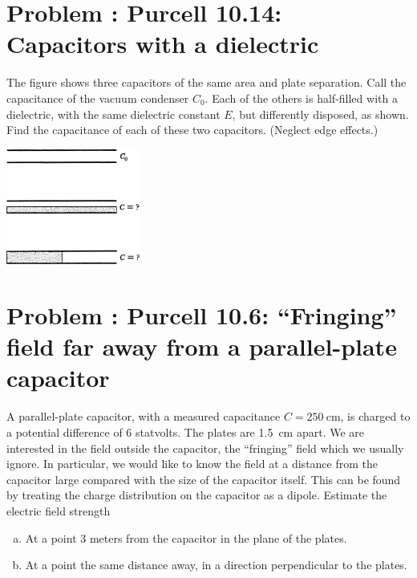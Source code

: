 \documentclass[problems]{esg8022pset}
\begin{document}
\section{Problem \thesection: Purcell 10.14: Capacitors with a dielectric}
  The figure shows three capacitors of the same area and plate
  separation. Call the capacitance of the vacuum condenser $C_0$. Each of
  the others is half-filled with a dielectric, with the same dielectric constant
  $E$, but differently disposed, as shown. Find the capacitance of
  each of these two capacitors. (Neglect edge effects.)
  \begin{center}\includegraphics[width=0.33\textwidth]{ps04_08}\end{center}
\section{Problem \thesection: Purcell 10.6: ``Fringing'' field far away from a parallel-plate capacitor}
  A parallel-plate capacitor, with a measured capacitance $C = \SI{250}{\centi\meter}$,
  is charged to a potential difference of 6 statvolts. The plates
  are \SI{1.5}{\centi\meter} apart. We are interested in the field outside the capacitor,
  the ``fringing'' field which we usually ignore. In particular, we would
  like to know the field at a distance from the capacitor large compared
  with the size of the capacitor itself. This can be found by treating the
  charge distribution on the capacitor as a dipole. Estimate the electric
  field strength
  \begin{enumerate}[(a)]
    \item At a point 3 meters from the capacitor in the plane of the plates.
    \item At a point the same distance away, in a direction perpendicular to the plates.
  \end{enumerate}
\end{document}
